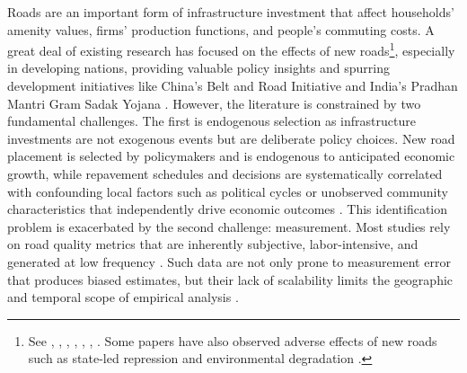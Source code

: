 Roads are an important form of infrastructure investment that affect households' amenity values, firms' production functions, and people's commuting costs. A great deal of existing research has focused on the effects of new roads\footnote{See \cite{ghani2016highway}, \cite{beenstock2016hedonic}, \cite{levkovich2016effects}, \cite{hoogendoorn2019house}, \cite{theisen2021road}, \cite{gibbons2019new}, \cite{fretz2022highways}. Some papers have also observed adverse effects of new roads such as state-led repression \citep{gonzalez2025} and environmental degradation \citep{asher2020eco}.}, especially in developing nations, providing valuable policy insights and spurring development initiatives like China's Belt and Road Initiative \citep{huang2016understanding} and India's Pradhan Mantri Gram Sadak Yojana \citep{asher2020}. However, the literature is constrained by two fundamental challenges. The first is endogenous selection as infrastructure investments are not exogenous events but are deliberate policy choices. New road placement is selected by policymakers and is endogenous to anticipated economic growth, while repavement schedules and decisions are systematically correlated with confounding local factors such as political cycles or unobserved community characteristics that independently drive economic outcomes \citep{duranton2011fundamental, gonzalez2023land}. This identification problem is exacerbated by the second challenge: measurement. Most studies rely on road quality metrics that are inherently subjective, labor-intensive, and generated at low frequency \citep{attoh2013pavement}. Such data are not only prone to measurement error that produces biased estimates, but their lack of scalability limits the geographic and temporal scope of empirical analysis \citep{list2022voltage}.
 
